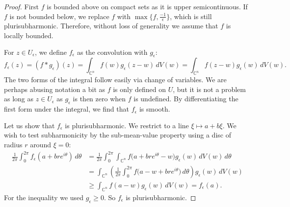 \documentclass[12pt,openany]{book}
\newcommand{\C}{{\mathbb{C}}}
\theoremstyle{plain}
\theoremstyle{remark}
\theoremstyle{definition}
\theoremstyle{exercise}
\theoremstyle{example}
\begin{document}
\begin{proof}
First $f$ is bounded above on compact sets as it is upper semicontinuous.
If $f$ is not bounded below, we replace $f$ with $\max \bigl\{ f ,
\frac{-1}{\epsilon}
\bigr\}$, which is still plurisubharmonic.  Therefore, without loss of generality
we assume that $f$ is locally bounded.

For $z \in U_\epsilon$, we define $f_\epsilon$ as
the convolution with $g_\epsilon$:
%
\begin{equation*}
f_\epsilon(z) = (f * g_\epsilon)(z) =
\int_{\C^n} f(w) g_\epsilon (z-w) \, dV(w) =
\int_{\C^n} f(z-w) g_\epsilon (w) \, dV(w) .
\end{equation*}
The two forms of the integral follow easily via change of variables.
We are perhaps abusing notation a bit as $f$ is only defined on $U$,
but it is not a problem as long as $z \in
U_\epsilon$ as $g_\epsilon$ is then zero when $f$ is undefined.
By differentiating the first form under the integral, we find that
$f_\epsilon$ is smooth.

Let us show that $f_\epsilon$ is plurisubharmonic.  We restrict to a
line $\xi \mapsto a+b\xi$.
We wish to test subharmonicity by the sub-mean-value property using a disc
of radius $r$ around $\xi = 0$:
\begin{equation*}
\begin{split}
\frac{1}{2\pi} \int_0^{2\pi} f_\epsilon(a+bre^{i\theta})\, d\theta & =
\frac{1}{2\pi} \int_0^{2\pi}
\int_{\C^n}
f\bigl(a+bre^{i\theta}-w\bigr) g_\epsilon (w) \, dV(w) 
\,d\theta
\\
& =
\int_{\C^n}
\left(
\frac{1}{2\pi} \int_0^{2\pi}
f\bigl(a-w+bre^{i\theta}\bigr) \, d\theta \right) g_\epsilon (w) \, dV(w) 
\\
& \geq 
\int_{\C^n}
f(a-w) g_\epsilon (w) \, dV(w)  = f_\epsilon(a).
\end{split}
\end{equation*}
For the inequality we used $g_\epsilon \geq 0$.
So $f_\epsilon$ is plurisubharmonic.


\end{proof}
\end{document}
